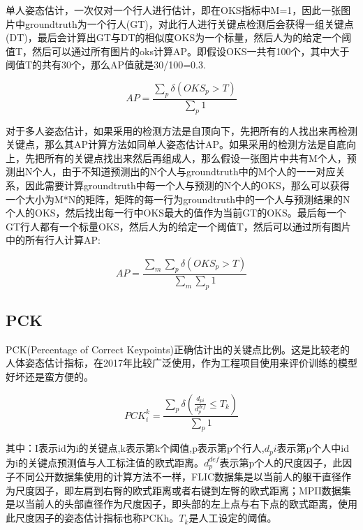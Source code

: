 单人姿态估计，一次仅对一个行人进行估计，即在OKS指标中M=1，因此一张图片中groundtruth为一个行人(GT)，对此行人进行关键点检测后会获得一组关键点(DT)，最后会计算出GT与DT的相似度OKS为一个标量，然后人为的给定一个阈值T，然后可以通过所有图片的oks计算AP。即假设OKS一共有100个，其中大于阈值T的共有30个，那么AP值就是30/100=0.3.

\begin{equation}
AP = \frac{{\sum\limits_p {\delta \left( {OK{S_p} > T} \right)} }}{{\sum\limits_p 1 }}
\end{equation}

对于多人姿态估计，如果采用的检测方法是自顶向下，先把所有的人找出来再检测关键点，那么其AP计算方法如同单人姿态估计AP。如果采用的检测方法是自底向上，先把所有的关键点找出来然后再组成人，那么假设一张图片中共有M个人，预测出N个人，由于不知道预测出的N个人与groundtruth中的M个人的一一对应关系，因此需要计算groundtruth中每一个人与预测的N个人的OKS，那么可以获得一个大小为M*N的矩阵，矩阵的每一行为groundtruth中的一个人与预测结果的N个人的OKS，然后找出每一行中OKS最大的值作为当前GT的OKS。最后每一个GT行人都有一个标量OKS，然后人为的给定一个阈值T，然后可以通过所有图片中的所有行人计算AP:

\begin{equation}
AP = \frac{{\sum\limits_m {\sum\limits_p {\delta \left( {OK{S_p} > T} \right)} } }}{{\sum\limits_m {\sum\limits_p 1 } }}
\end{equation}

\subsection{PCK}

PCK(Percentage of Correct Keypoints)正确估计出的关键点比例。这是比较老的人体姿态估计指标，在2017年比较广泛使用，作为工程项目使用来评价训练的模型好坏还是蛮方便的。

\begin{equation}
PCK_i^k = \frac{{\sum\limits_p {\delta \left( {\frac{{{d_{pi}}}}{{d_p^{def}}} \le {T_k}} \right)} }}{{\sum\limits_p 1 }}
\end{equation}

其中：I表示id为i的关键点,k表示第k个阈值,p表示第p个行人,$d_pi$表示第p个人中id为i的关键点预测值与人工标注值的欧式距离。$d_p^{def}$表示第p个人的尺度因子，此因子不同公开数据集使用的计算方法不一样，FLIC数据集是以当前人的躯干直径作为尺度因子，即左肩到右臀的欧式距离或者右键到左臀的欧式距离；MPII数据集是以当前人的头部直径作为尺度因子，即头部的左上点与右下点的欧式距离，使用此尺度因子的姿态估计指标也称PCKh。$T_k$是人工设定的阈值。

